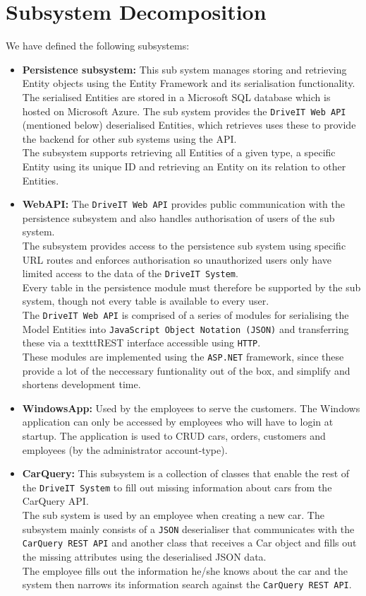 \section{Subsystem Decomposition}
We have defined the following subsystems:
\begin{itemize}
	\item \textbf{Persistence subsystem:} This sub system manages storing and retrieving Entity objects using the Entity Framework and its serialisation functionality.\\
	The serialised Entities are stored in a Microsoft SQL database which is hosted on Microsoft Azure. The sub system provides the \texttt{DriveIT Web API} (mentioned below) deserialised Entities, which retrieves uses these to provide the backend for other sub systems using the API.\\
	The subsystem supports retrieving all Entities of a given type, a specific Entity using its unique ID and retrieving an Entity on its relation to other Entities. 
	\item \textbf{WebAPI:} The \texttt{DriveIT Web API} provides public communication with the persistence subsystem and also handles authorisation of users of the sub system.\\
	The subsystem provides access to the persistence sub system using specific URL routes and enforces authorisation so unauthorized users only have limited access to the data of the \texttt{DriveIT System}.\\ 
	Every table in the persistence module must therefore be supported by the sub system, though not every table is available to every user.\\
	The \texttt{DriveIT Web API} is comprised of a series of modules for serialising the Model Entities into \texttt{JavaScript Object Notation (JSON)} and transferring these via a texttt{REST} interface accessible using \texttt{HTTP}. \\
	These modules are implemented using the \texttt{ASP.NET} framework, since these provide a lot of the neccessary funtionality out of the box, and simplify and shortens development time.
	\item \textbf{WindowsApp:} Used by the employees to serve the customers. The Windows application can only be accessed by employees who will have to login at startup. The application is used to CRUD cars, orders, customers and employees (by the administrator account-type).
	\item \textbf{CarQuery:} This subsystem is a collection of classes that enable the rest of the \texttt{DriveIT System} to fill out missing information about cars from the CarQuery API.\\
	The sub system is used by an employee when creating a new car. The subsystem mainly consists of a \texttt{JSON} deserialiser that communicates with the \texttt{CarQuery REST API} and another class that receives a Car object and fills out the missing attributes using the deserialised JSON data. \\
	The employee fills out the information he/she knows about the car and the system then narrows its information search against the \texttt{CarQuery REST API}.
\end{itemize}